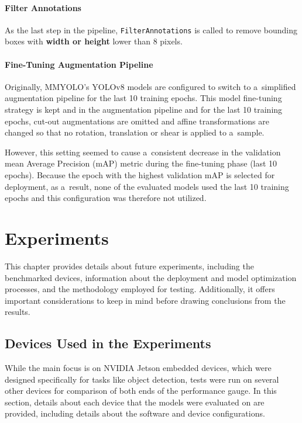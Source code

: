 \subsubsection*{Filter Annotations}

As the last step in the pipeline, \texttt{FilterAnnotations} is called to remove
bounding boxes with \textbf{width or height} lower than \num{8} pixels.

\subsubsection{Fine-Tuning Augmentation Pipeline}

Originally, MMYOLO's YOLOv8 models are configured to switch to a~simplified
augmentation pipeline for the last 10 training epochs. This model fine-tuning
strategy is kept and in the augmentation pipeline and for the last 10 training
epochs, cut-out augmentations are omitted and affine transformations are changed
so that no rotation, translation or shear is applied to a~sample.

However, this setting seemed to cause a~consistent decrease in the validation
mean Average Precision (mAP) metric during the fine-tuning phase (last 10
epochs). Because the epoch with the highest validation mAP is selected for
deployment, as a~result, none of the evaluated models used the last 10 training
epochs and this configuration was therefore not utilized.




\chapter{Experiments}
\label{Experiments}

This chapter provides details about future experiments, including the
benchmarked devices, information about the deployment and model optimization
processes, and the methodology employed for testing. Additionally, it offers
important considerations to keep in mind before drawing conclusions from the
results.


\section{Devices Used in the Experiments}

While the main focus is on NVIDIA Jetson embedded devices, which were designed
specifically for tasks like object detection, tests were run on several other
devices for comparison of both ends of the performance gauge. In this section,
details about each device that the models were evaluated on are provided,
including details about the software and device configurations.

